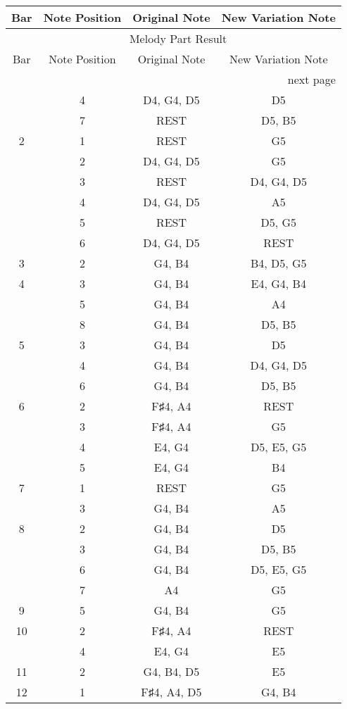 \documentclass{article}
\begin{document}
\begin{longtable}{|c|c|c|c|}
\hline
Bar & Note Position & Original Note & New Variation Note \\ \hline
\endfirsthead
\multicolumn{4}{c}{{\tablename\ \thetable{} Melody Part Result}} \\
\hline
Bar & Note Position & Original Note & New Variation Note \\ \hline
\hline
\endhead
\hline
\multicolumn{4}{r}{next page}
\endfoot
\hline
\endlastfoot
1 & 3 & REST & D5 \\ 
  & 4 & D4, G4, D5 & D5 \\ 
  & 7 & REST & D5, B5 \\ 
\hline
2 & 1 & REST & G5 \\ 
  & 2 & D4, G4, D5 & G5 \\ 
  & 3 & REST & D4, G4, D5 \\ 
  & 4 & D4, G4, D5 & A5 \\ 
  & 5 & REST & D5, G5 \\ 
  & 6 & D4, G4, D5 & REST \\ 
\hline
3 & 2 & G4, B4 & B4, D5, G5 \\ 
\hline
4 & 3 & G4, B4 & E4, G4, B4 \\ 
  & 5 & G4, B4 & A4 \\ 
  & 8 & G4, B4 & D5, B5 \\ 
\hline
5 & 3 & G4, B4 & D5 \\ 
  & 4 & G4, B4 & D4, G4, D5 \\ 
  & 6 & G4, B4 & D5, B5 \\ 
\hline
6 & 2 & F♯4, A4 & REST \\ 
  & 3 & F♯4, A4 & G5 \\ 
  & 4 & E4, G4 & D5, E5, G5 \\ 
  & 5 & E4, G4 & B4 \\ 
\hline
7 & 1 & REST & G5 \\ 
  & 3 & G4, B4 & A5 \\ 
\hline
8 & 2 & G4, B4 & D5 \\ 
  & 3 & G4, B4 & D5, B5 \\ 
  & 6 & G4, B4 & D5, E5, G5 \\ 
  & 7 & A4 & G5 \\ 
\hline
9 & 5 & G4, B4 & G5 \\ 
\hline
10 & 2 & F♯4, A4 & REST \\ 
  & 4 & E4, G4 & E5 \\ 
\hline
11 & 2 & G4, B4, D5 & E5 \\ 
\hline
12 & 1 & F♯4, A4, D5 & G4, B4 \\ 

\end{longtable}
\end{document}
